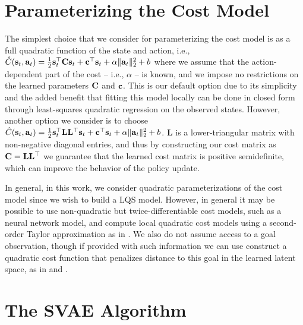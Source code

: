 \section{Parameterizing the Cost Model}
\label{sec:supp-cost}

The simplest choice that we consider for parameterizing the cost model is as a full quadratic function of the state and action, i.e.,     $\hat{C}(\mathbf{s}_t,\mathbf{a}_t)=\frac{1}{2}\mathbf{s}_t^\top\mathbf{C}\mathbf{s}_t+\mathbf{c}^\top\mathbf{s}_t+\alpha\|\mathbf{a}_t\|_2^2+b$ where we assume that the action-dependent part of the cost -- i.e., $\alpha$ -- is known, and we impose no restrictions on the learned parameters $\mathbf{C}$ and $\mathbf{c}$. This is our default option due to its simplicity and the added benefit that fitting this model locally can be done in closed form through least-squares quadratic regression on the observed states. However, another option we consider is to choose $\hat{C}(\mathbf{s}_t,\mathbf{a}_t)=\frac{1}{2}\mathbf{s}_t^\top\mathbf{L}\mathbf{L}^\top\mathbf{s}_t+\mathbf{c}^\top\mathbf{s}_t+\alpha\|\mathbf{a}_t\|_2^2+b$. $\mathbf{L}$ is a lower-triangular matrix with non-negative diagonal entries, and thus by constructing our cost matrix as $\mathbf{C}=\mathbf{L}\mathbf{L}^\top$ we guarantee that the learned cost matrix is positive semidefinite, which can improve the behavior of the policy update.

In general, in this work, we consider quadratic parameterizations of the cost model since we wish to build a LQS model. However, in general it may be possible to use non-quadratic but twice-differentiable cost models, such as a neural network model, and compute local quadratic cost models using a second-order Taylor approximation as in \citet{mfcgps}. We also do not assume access to a goal observation, though if provided with such information we can use construct a quadratic cost function that penalizes distance to this goal in the learned latent space, as in \citet{spatial-ae} and \citet{e2c}.


\section{The SVAE Algorithm}
\label{sec:supp-svae}

